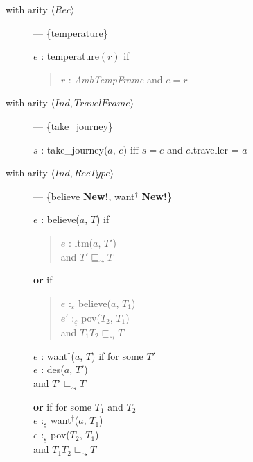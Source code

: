\begin{description}
\begin{description}
  

  
\item[with arity \textnormal{$\langle\textit{Rec}\rangle$}] ---
  \{temperature\}
  
$e$ : temperature$(r)$ if 
  \begin{quote}
    $r$ : \textit{AmbTempFrame} and $e=r$
  \end{quote}

  
\item[with arity
  \textnormal{$\langle\textit{Ind},\textit{TravelFrame}\rangle$}] ---
  \{take\_journey\}

  $s$ : take\_journey($a$, $e$) iff $s=e$ and $e$.traveller = $a$

\item[with arity
  \textnormal{$\langle\textit{Ind},\textit{RecType}\rangle$}]
  --- \{believe \textbf{New!}, want$^{\dagger}$ \textbf{New!}\}

  $e$ : believe($a$, $T$) if
  \begin{quote}
    $e$ : ltm($a$, $T'$) \\
    and $T'\sqsubseteq_{\leadsto}T$
  \end{quote}
  \textbf{or} if
  \begin{quote}
    $e$ :$_{\underline{\varepsilon}}$ believe($a$, $T_1$)\\
    $e'$ :$_{\underline{\varepsilon}}$ pov($T_2$, $T_1$)\\
    and $T_1$\fbox{\d{$\wedge$}}$T_2 \sqsubseteq_{\leadsto}T$
  \end{quote}

  \bigskip

  $e$ : want$^{\dagger}$($a$, $T$) if for some $T'$\\
  \hspace*{2em} $e$ : des($a$, $T'$) \\
  \hspace*{2em} and $T'\sqsubseteq_{\leadsto}T$

  \textbf{or} if for some $T_1$ and $T_2$\\
  \hspace*{2em} $e$ :$_{\underline{\varepsilon}}$ want$^{\dagger}$($a$, $T_1$)\\
  \hspace*{2em} $e$ :$_{\underline{\varepsilon}}$ pov($T_2$, $T_1$) \\
  \hspace*{2em} and $T_1$\fbox{\d{$\wedge$}}$T_2
  \sqsubseteq_{\leadsto}T$
  
\end{description}


\end{description}
